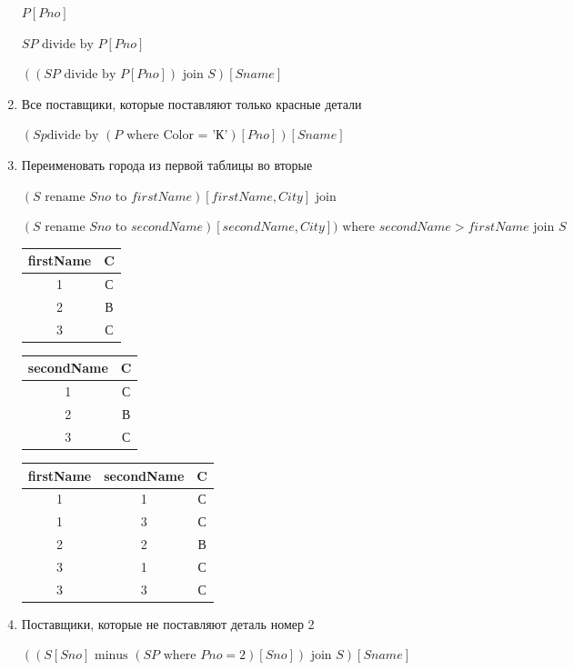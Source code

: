 \documentclass[a4paper, 14pt]{report}
\begin{document}
\begin{enumerate}
        $P[Pno]$

        $SP \text{ divide by } P[Pno]$

        $((SP \text{ divide by } P[Pno]) \text{ join } S)[Sname]$

    \item Все поставщики, которые поставляют только красные детали

        $(Sp \text{divide by }(P \text{ where } \text{Color = 'К'})[Pno])[Sname]$

    \item Переименовать города из первой таблицы во вторые

        $(S \text{ rename } Sno \text{ to } firstName)[firstName, City] \text{ join }$
        
        $(S \text{ rename } Sno \text{ to } secondName)[secondName, City]) \text{ where } secondName > firstName \text{ join } S$

        \begin{tabular}{|c|c|}
            \hline
            firstName & C \\
            \hline
            1 & С \\
            2 & В \\
            3 & С \\
            \hline
        \end{tabular}

        \begin{tabular}{|c|c|}
            \hline
            secondName & C \\
            \hline
            1 & С \\
            2 & В \\
            3 & С \\
            \hline
        \end{tabular}

        \begin{tabular}{|c|c|c|}
            \hline
            firstName & secondName & C \\
            \hline
            1 & 1 & С \\
            1 & 3 & С \\
            2 & 2 & В \\
            3 & 1 & С \\
            3 & 3 & С \\
            \hline
        \end{tabular}

    \item Поставщики, которые не поставляют деталь номер 2

        $((S[Sno] \text{ minus } (SP \text{ where } Pno=2)[Sno]) \text{ join } S)[Sname]$

\end{enumerate}
\end{document}
